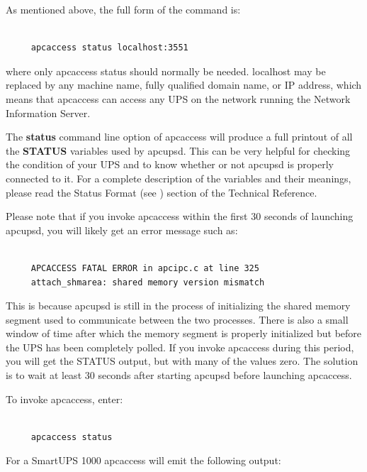 \label{index-apcaccess-status-112}
\label{index-status_002c-apcaccess-113}
As mentioned above, the full form of the command is: 

\footnotesize
\begin{verbatim}
     
     apcaccess status localhost:3551
\end{verbatim}
\normalsize

where only apcaccess status should normally be needed. localhost may be
replaced by any machine name, fully qualified domain name, or IP address,
which means that apcaccess can access any UPS on the network running the
Network Information Server.  

The {\bf status} command line option of apcaccess will produce a full printout
of all the {\bf STATUS} variables used by apcupsd. This can be very helpful
for checking the condition of your UPS and to know whether or not apcupsd is
properly connected to it. For a complete description of the variables and
their meanings, please read the Status Format (see 
) section of
the Technical Reference.  

Please note that if you invoke apcaccess within the first 30 seconds of
launching apcupsd, you will likely get an error message such as: 

\footnotesize
\begin{verbatim}
     
     APCACCESS FATAL ERROR in apcipc.c at line 325
     attach_shmarea: shared memory version mismatch
\end{verbatim}
\normalsize

This is because apcupsd is still in the process of initializing the shared
memory segment used to communicate between the two processes. There is also a
small window of time after which the memory segment is properly initialized
but before the UPS has been completely polled. If you invoke apcaccess during
this period, you will get the STATUS output, but with many of the values zero.
The solution is to wait at least 30 seconds after starting apcupsd before
launching apcaccess.  

To invoke apcaccess, enter: 

\footnotesize
\begin{verbatim}
     
     apcaccess status
\end{verbatim}
\normalsize

For a SmartUPS 1000 apcaccess will emit the following output: 

